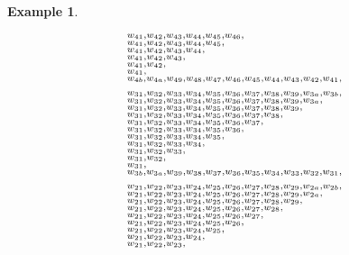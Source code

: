 \documentclass{amsart}
\theoremstyle{plain}
\theoremstyle{definition}
\newtheorem{example}[theorem]{Example}
\theoremstyle{remark}
\begin{document}
\begin{example}
\begin{figure}[h]
\begin{align*}
{\begin{subarray}{l}
w_{41}, w_{42}, w_{43}, w_{44}, w_{45}, w_{46}, \\
w_{41}, w_{42}, w_{43}, w_{44}, w_{45}, \\
w_{41}, w_{42}, w_{43}, w_{44}, \\
w_{41}, w_{42}, w_{43}, \\
w_{41}, w_{42}, \\
w_{41}, \\
w_{4b}, w_{4a}, w_{49}, w_{48}, w_{47}, w_{46}, w_{45}, w_{44}, w_{43}, w_{42}, w_{41}, \\
\\
w_{31}, w_{32}, w_{33}, w_{34}, w_{35}, w_{36}, w_{37}, w_{38}, w_{39}, w_{3a}, w_{3b}, \\
w_{31}, w_{32}, w_{33}, w_{34}, w_{35}, w_{36}, w_{37}, w_{38}, w_{39}, w_{3a}, \\
w_{31}, w_{32}, w_{33}, w_{34}, w_{35}, w_{36}, w_{37}, w_{38}, w_{39}, \\
w_{31}, w_{32}, w_{33}, w_{34}, w_{35}, w_{36}, w_{37}, w_{38}, \\
w_{31}, w_{32}, w_{33}, w_{34}, w_{35}, w_{36}, w_{37}, \\
w_{31}, w_{32}, w_{33}, w_{34}, w_{35}, w_{36}, \\
w_{31}, w_{32}, w_{33}, w_{34}, w_{35}, \\
w_{31}, w_{32}, w_{33}, w_{34}, \\
w_{31}, w_{32}, w_{33}, \\
w_{31}, w_{32}, \\
w_{31}, \\
w_{3b}, w_{3a}, w_{39}, w_{38}, w_{37}, w_{36}, w_{35}, w_{34}, w_{33}, w_{32}, w_{31}, \\
\\
w_{21}, w_{22}, w_{23}, w_{24}, w_{25}, w_{26}, w_{27}, w_{28}, w_{29}, w_{2a}, w_{2b}, \\
w_{21}, w_{22}, w_{23}, w_{24}, w_{25}, w_{26}, w_{27}, w_{28}, w_{29}, w_{2a}, \\
w_{21}, w_{22}, w_{23}, w_{24}, w_{25}, w_{26}, w_{27}, w_{28}, w_{29}, \\
w_{21}, w_{22}, w_{23}, w_{24}, w_{25}, w_{26}, w_{27}, w_{28}, \\
w_{21}, w_{22}, w_{23}, w_{24}, w_{25}, w_{26}, w_{27}, \\
w_{21}, w_{22}, w_{23}, w_{24}, w_{25}, w_{26}, \\
w_{21}, w_{22}, w_{23}, w_{24}, w_{25}, \\
w_{21}, w_{22}, w_{23}, w_{24}, \\
w_{21}, w_{22}, w_{23}, \\

\end{subarray}}
\end{align*}
\end{figure}
\end{example}
\end{document}
